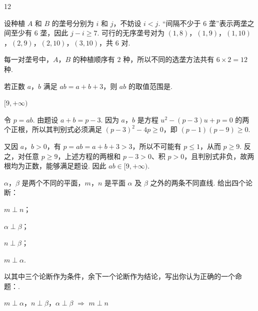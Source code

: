 \documentclass[UTF8,a4paper,oneside,11pt]{ctexbook}
\begin{document}
\begin{answer}
12
\end{answer}

\begin{solution}
设种植 \(A\) 和 \(B\) 的垄号分别为 \(i\) 和 \(j\)，不妨设 \(i<j\). “间隔不少于 \(6\) 垄”表示两垄之间至少有 \(6\) 垄，因此 \(j-i\geqslant7\). 可行的无序垄号对为
\((1,8)\)，\((1,9)\)，\((1,10)\)，\((2,9)\)，\((2,10)\)，\((3,10)\)，共 \(6\) 对.

每一对垄号中，\(A\)，\(B\) 的种植顺序有 \(2\) 种，所以不同的选垄方法共有 \(6\times2=12\) 种.
\end{solution}

\begin{problem}
若正数 \(a\)，\(b\) 满足 \(ab=a+b+3\)，则 \(ab\) 的取值范围是\fillinblank{}.
\end{problem}

\begin{answer}
\([9,+\infty)\)
\end{answer}

\begin{solution}
令 \(p=ab\). 由题设 \(a+b=p-3\). 因为 \(a\)，\(b\) 是方程
\(u^2-(p-3)u+p=0\) 的两个正根，所以其判别式必须满足
\((p-3)^2-4p\geqslant0\)，即 \((p-1)(p-9)\geqslant0\).

又因 \(a\)，\(b>0\)，有 \(p=ab=a+b+3>3\)，所以不可能有 \(p\leqslant1\)，从而 \(p\geqslant9\). 反之，对任意 \(p\geqslant9\)，上述方程的两根和 \(p-3>0\)、积 \(p>0\)，且判别式非负，故两根均为正数，能够满足题设. 因此 \(ab\in[9,+\infty)\).
\end{solution}

\begin{problem}
\(\alpha\)，\(\beta\) 是两个不同的平面，\(m\)，\(n\) 是平面 \(\alpha\) 及 \(\beta\) 之外的两条不同直线. 给出四个论断：

\begin{circlelist}
\item \(m \perp n\)；
\item \(\alpha \perp \beta\)；
\item \(n \perp \beta\)；
\item \(m \perp \alpha\).
\end{circlelist}

以其中三个论断作为条件，余下一个论断作为结论，写出你认为正确的一个命题：\fillinblank{}.
\end{problem}

\begin{answer}
\(m\perp\alpha\)，\(n\perp\beta\)，\(\alpha\perp\beta\) \(\Longrightarrow\) \(m\perp n\)
\end{answer}
\end{document}
